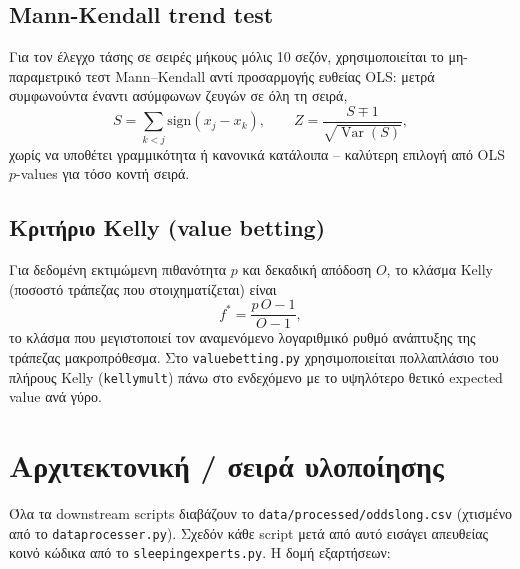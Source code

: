 \documentclass[11pt,a4paper]{article}
\newcommand{\file}[1]{\texttt{#1}}
\newcommand{\var}[1]{\texttt{#1}}
\renewcommand{\_}{\oldunderscore\allowbreak}
\begin{document}
\subsection{Mann-Kendall trend test}

Για τον έλεγχο τάσης σε σειρές μήκους μόλις 10 σεζόν, χρησιμοποιείται το μη-παραμετρικό
τεστ Mann--Kendall αντί προσαρμογής ευθείας OLS: μετρά συμφωνούντα έναντι ασύμφωνων ζευγών
σε όλη τη σειρά,
\begin{equation}
  S=\sum_{k<j}\mathrm{sign}(x_j-x_k), \qquad
  Z = \frac{S \mp 1}{\sqrt{\operatorname{Var}(S)}},
\end{equation}
χωρίς να υποθέτει γραμμικότητα ή κανονικά κατάλοιπα -- καλύτερη επιλογή από OLS $p$-values
για τόσο κοντή σειρά.

\subsection{Κριτήριο Kelly (value betting)}
\label{sec:kelly-theory}

Για δεδομένη εκτιμώμενη πιθανότητα $p$ και δεκαδική απόδοση $O$, το κλάσμα Kelly (ποσοστό
τράπεζας που στοιχηματίζεται) είναι
\begin{equation}
  f^{*} = \frac{p\,O - 1}{O - 1},
\end{equation}
το κλάσμα που μεγιστοποιεί τον αναμενόμενο λογαριθμικό ρυθμό ανάπτυξης της τράπεζας
μακροπρόθεσμα. Στο \file{value\_betting.py} χρησιμοποιείται πολλαπλάσιο του πλήρους Kelly
(\var{kelly\_mult}) πάνω στο ενδεχόμενο με το υψηλότερο θετικό expected value ανά γύρο.

\section{Αρχιτεκτονική / σειρά υλοποίησης}
\label{sec:architecture}

Όλα τα downstream scripts διαβάζουν το \file{data/processed/odds\_long.csv} (χτισμένο από
το \file{data\_processer.py}). Σχεδόν κάθε script μετά από αυτό εισάγει απευθείας κοινό κώδικα
από το \file{sleeping\_experts.py}. Η δομή εξαρτήσεων:
\end{document}
